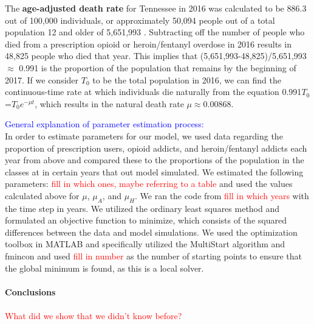 \documentclass[12pt]{article}
\begin{document}
The \textbf{age-adjusted death rate} for Tennessee in 2016 was calculated to be 886.3 out of 100,000 individuals, or approximately 50,094 people out of a total population 12 and older of 5,651,993 \cite{Kaiser}. Subtracting off the number of people who died from a prescription opioid or heroin/fentanyl overdose in 2016 results in 48,825 people who died that year. This implies that (5,651,993-48,825)/5,651,993 $\approx$ 0.991 is the proportion of the population that remains by the beginning of 2017. If we consider $T_0$ to be the total population in 2016, we can find the continuous-time rate at which individuals die naturally from the equation 0.991$T_0$=$T_0e^{-\mu t}$, which results in the natural death rate $\mu \approx 0.00868$.


\textcolor{blue}{General explanation of parameter estimation process:} \\
In order to estimate parameters for our model, we used data regarding the proportion of prescription users, opioid addicts, and heroin/fentanyl addicts each year from above and compared these to the proportions of the population in the classes at in certain years that out model simulated. We estimated the following parameters: \textcolor{red}{fill in which ones, maybe referring to a table} and used the values calculated above for $\mu$, $\mu_A$, and $\mu_H.$ We ran the code from \textcolor{red}{fill in which years} with the time step in years. We utilized the ordinary least squares method and formulated an objective function to minimize, which consists of the squared differences between the data and model simulations. We used the optimization toolbox in MATLAB and specifically utilized the MultiStart algorithm and fmincon and used \textcolor{red}{fill in number} as the number of starting points to ensure that the global minimum is found, as this is a local solver. \\ \\
\textbf{Conclusions} \\ \\
 \textcolor{red}{What did we show that we didn't know before?}



\pagebreak



 
\end{document}
